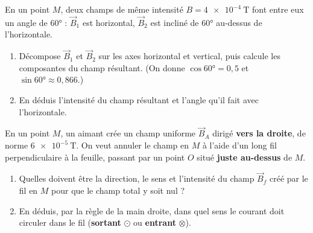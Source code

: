 \documentclass[11pt,a4paper]{article}
\newcommand{\vv}[1]{\vec{#1}}\newcommand{\ds}{\displaystyle}
\begin{document}
\begin{exo}
En un point $M$, deux champs de même intensité $B=\qty{4e-4}{\tesla}$ font entre eux un angle de
\ang{60} : $\vv{B}_1$ est horizontal, $\vv{B}_2$ est incliné de \ang{60} au-dessus de l'horizontale.
\begin{center}
\end{center}
\begin{enumerate}[label=\alph*)]
  \item Décompose $\vv{B}_1$ et $\vv{B}_2$ sur les axes horizontal et vertical, puis calcule les
        composantes du champ résultant. (On donne $\cos\ang{60}=0{,}5$ et $\sin\ang{60}\approx0{,}866$.)
  \item En déduis l'intensité du champ résultant et l'angle qu'il fait avec l'horizontale.
\end{enumerate}
\end{exo}

\begin{exo}
En un point $M$, un aimant crée un champ uniforme $\vv{B}_A$ dirigé \textbf{vers la droite}, de
norme $\qty{6e-5}{\tesla}$. On veut annuler le champ en $M$ à l'aide d'un long fil perpendiculaire
à la feuille, passant par un point $O$ situé \textbf{juste au-dessus} de $M$.
\begin{center}
\end{center}
\begin{enumerate}[label=\alph*)]
  \item Quelles doivent être la direction, le sens et l'intensité du champ $\vv{B}_f$ créé par le fil
        en $M$ pour que le champ total y soit nul ?
  \item En déduis, par la règle de la main droite, dans quel sens le courant doit circuler dans le fil
        (\textbf{sortant} $\odot$ ou \textbf{entrant} $\otimes$).
\end{enumerate}
\end{exo}
\end{document}
